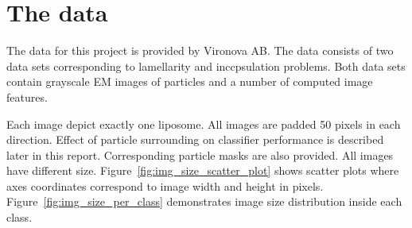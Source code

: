 \documentclass[a4paper, 11pt, table]{article}
\begin{document}
\section{The data}
\label{sec:dataset}
The data for this project is provided by Vironova AB. The data consists of two data sets corresponding to lamellarity and inccpsulation problems. Both data sets contain grayscale EM images of particles and a number of computed image features.

Each image depict exactly one liposome. All images are padded 50 pixels in each direction. Effect of particle surrounding on classifier performance is described later in this report. Corresponding particle masks are also provided. All images have different size. Figure~\ref{fig:img_size_scatter_plot} shows scatter plots where axes coordinates correspond to image width and height in pixels. Figure~\ref{fig:img_size_per_class} demonstrates image size distribution inside each class. 
\end{document}

